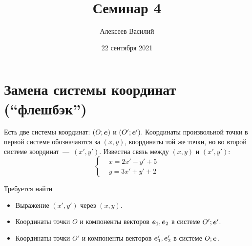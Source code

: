 \documentclass[a4paper,12pt]{article}
\author{Алексеев Василий}
\title{Семинар 4}
\date{22 сентября 2021}
\begin{document}
  \maketitle
  
  \tableofcontents

  \thispagestyle{empty}
  
  \newpage
  
  
  
  \section{Замена системы координат (``флешбэк'')}
  
  \begin{problem}[4.5]
    Есть две системы координат: $(O; \boldsymbol e)$ и $(O'; \boldsymbol e')$.
    Координаты произвольной точки в первой системе обозначаются за $(x, y)$, координаты той же точки, но во второй системе координат~---~$(x', y')$.
    Известна связь между $(x, y)$ и $(x', y')$:
    \[
      \left\{
        \begin{aligned}
          &x = 2x' - y' + 5\\
          &y = 3x' + y' + 2
        \end{aligned}
      \right.
    \]
    
    Требуется найти
    \begin{itemize}
      \item Выражение $(x', y')$ через $(x, y)$.
      \item Координаты точки $O$ и компоненты векторов $\boldsymbol e_1, \boldsymbol e_2$ в системе $O'; \boldsymbol e'$.
      \item Координаты точки $O'$ и компоненты векторов $\boldsymbol e_1', \boldsymbol e_2'$ в системе $O; \boldsymbol e$.
    \end{itemize}
  \end{problem}
  
\end{document}
